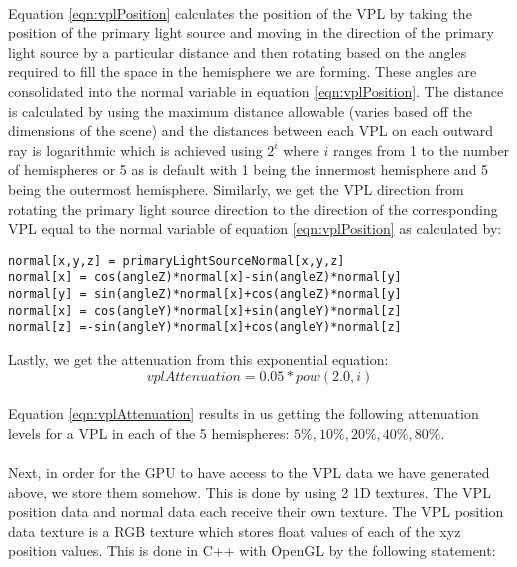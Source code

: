 \paragraph{}
Equation \ref{eqn:vplPosition} calculates the position of the VPL by taking the position of the primary light source and moving in the direction of the primary light source by a particular distance and then rotating based on the angles required to fill the space in the hemisphere we are forming.  These angles are consolidated into the normal variable in equation \ref{eqn:vplPosition}.  The distance is calculated by using the maximum distance allowable (varies based off the dimensions of the scene) and the distances between each VPL on each outward ray is logarithmic which is achieved using $2^i$ where $i$ ranges from 1 to the number of hemispheres or 5 as is default with 1 being the innermost hemisphere and 5 being the outermost hemisphere.  Similarly, we get the VPL direction from rotating the primary light source direction to the direction of the corresponding VPL equal to the normal variable of equation \ref{eqn:vplPosition} as calculated by:

\begin{lstlisting}
normal[x,y,z] = primaryLightSourceNormal[x,y,z]
normal[x] = cos(angleZ)*normal[x]-sin(angleZ)*normal[y]
normal[y] = sin(angleZ)*normal[x]+cos(angleZ)*normal[y]
normal[x] = cos(angleY)*normal[x]+sin(angleY)*normal[z]
normal[z] =-sin(angleY)*normal[x]+cos(angleY)*normal[z]
\end{lstlisting}

Lastly, we get the attenuation from this exponential equation:
\begin{equation}
vplAttenuation = 0.05*pow(2.0,i)\label{eqn:vplAttenuation}
\end{equation}

\paragraph{}
Equation \ref{eqn:vplAttenuation} results in us getting the following attenuation levels for a VPL in each of the 5 hemispheres: $5\%, 10\%, 20\%, 40\%, 80\%$.  

\paragraph{}
Next, in order for the GPU to have access to the VPL data we have generated above, we store them somehow.  This is done by using 2 1D textures.  The VPL position data and normal data each receive their own texture.  The VPL position data texture is a RGB texture which stores float values of each of the xyz position values.  This is done in C++ with OpenGL by the following statement:

